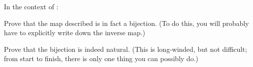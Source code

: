 \begin{problem}
	In the context of :
	\begin{enumerate}[(a)]
	\ii Prove that the map described is in fact a bijection.
	(To do this, you will probably have to explicitly write down the inverse map.)

	\ii \twochili Prove that the bijection is indeed natural.
	(This is long-winded, but not difficult; from start to finish,
	there is only one thing you can possibly do.)
	\end{enumerate}
\end{problem}


